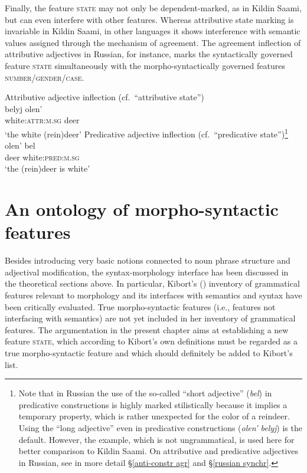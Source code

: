 Finally, the feature \textsc{state} may not only be dependent\hyp{}marked, as in Kildin Saami, but can even interfere with other features. Whereas attributive state marking is invariable in Kildin Saami, in other languages it shows interference with semantic values assigned through the mechanism of agreement. The agreement inflection of attributive adjectives in Russian, for instance, marks the syntactically governed feature \textsc{state} simultaneously with the morpho-syntactically governed features \textsc{number/gender/case}.
\begin{exe}
\ex
{}
\label{state np russian}
\begin{xlist}
\ex 
{\rm Attributive adjective inflection (cf.~“attributive state”)}\\
\gll 	belyj	olen'\\
	white:\textsc{attr:m.sg}	deer\\
\glt 	‘the white (rein)deer’
\ex	
{\rm Predicative adjective inflection (cf.~“predicative state”)}\footnote{Note that in Russian the use of the so-called “short adjective” (\textit{bel}) in predicative constructions is highly marked stilistically because it implies a temporary property, which is rather unexpected for the color of a reindeer. Using the “long adjective” even in predicative constructions (\textit{olen' belyj}) is the default. However, the example, which is not ungrammatical, is used here for better comparison to Kildin Saami. On attributive and predicative adjectives in Russian, see in more detail \S\ref{anti-constr agr} and \S\ref{russian synchr}.}
\\
\gll	olen' bel\\
	deer white:\textsc{pred:m.sg}\\
\glt	‘the (rein)deer is white’
\end{xlist}
\end{exe}

\section{An ontology of morpho-syntactic features}
Besides introducing very basic notions connected to noun phrase structure and adjectival modification, the syntax-morphology interface has been discussed in the theoretical sections above. In particular, Kibort's (\citeyear{kibort2010a}) inventory of grammatical features relevant to morphology and its interfaces with semantics and syntax have been critically evaluated. True morpho-syntactic features (i.e., features not interfacing with semantics) are not yet included in her inventory of grammatical features. The argumentation in the present chapter aims at establishing a new feature \textsc{state}, which according to Kibort's own definitions must be regarded as a true morpho-syntactic feature and which should definitely be added to Kibort's list. 

